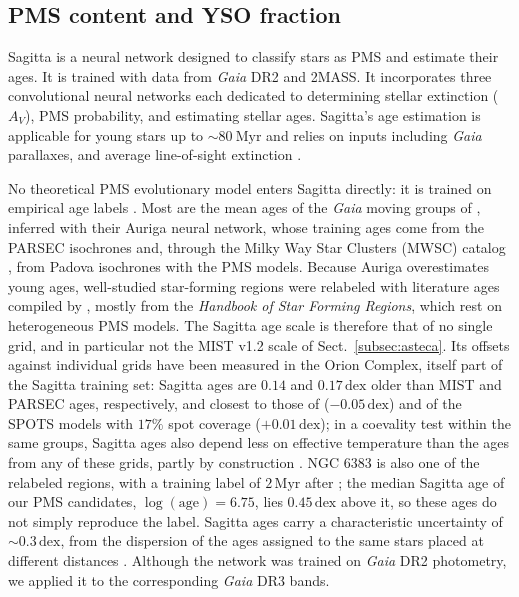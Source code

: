 \documentclass{aa}
\begin{document}
\subsection{PMS content and YSO fraction}\label{subsec:sagitta}
Sagitta is a neural network designed to classify stars as PMS and estimate their ages. It is trained with data from \textit{Gaia} DR2 and 2MASS\@. It incorporates three convolutional neural networks each dedicated to determining stellar extinction ($A_V$), PMS probability, and estimating stellar ages. Sagitta's age estimation is applicable for young stars up to $\sim 80~\mathrm{Myr}$ and relies on inputs including \textit{Gaia} parallaxes, and average line-of-sight extinction \citep{2021AJ....162..282M}.

No theoretical PMS evolutionary model enters Sagitta directly: it is trained on empirical age labels \citep{2021AJ....162..282M}. Most are the mean ages of the \textit{Gaia} moving groups of \citet{2020AJ....160..279K}, inferred with their Auriga neural network, whose training ages come from the PARSEC isochrones \citep{2017ApJ...835...77M} and, through the Milky Way Star Clusters (MWSC) catalog \citep{2013A&A...558A..53K}, from Padova isochrones with the \citet{2000A&A...358..593S} PMS models. Because Auriga overestimates young ages, well-studied star-forming regions were relabeled with literature ages compiled by \citet{2021AJ....162..282M}, mostly from the \textit{Handbook of Star Forming Regions}, which rest on heterogeneous PMS models. The Sagitta age scale is therefore that of no single grid, and in particular not the MIST v1.2 scale of Sect.~\ref{subsec:asteca}. Its offsets against individual grids have been measured in the Orion Complex, itself part of the Sagitta training set: Sagitta ages are $0.14$ and $0.17\,\mathrm{dex}$ older than MIST and PARSEC ages, respectively, and closest to those of \citet{2015A&A...577A..42B} ($-0.05\,\mathrm{dex}$) and of the SPOTS models \citep{2020ApJ...891...29S} with $17\%$ spot coverage ($+0.01\,\mathrm{dex}$); in a coevality test within the same groups, Sagitta ages also depend less on effective temperature than the ages from any of these grids, partly by construction \citep{2023AJ....165..182K}. NGC 6383 is also one of the relabeled regions, with a training label of $2\,\mathrm{Myr}$ after \citet{2008hsf2.book..497R}; the median Sagitta age of our PMS candidates, $\log(\mathrm{age})=6.75$, lies $0.45\,\mathrm{dex}$ above it, so these ages do not simply reproduce the label. Sagitta ages carry a characteristic uncertainty of $\sim0.3\,\mathrm{dex}$, from the dispersion of the ages assigned to the same stars placed at different distances \citep{2021AJ....162..282M}. Although the network was trained on \textit{Gaia} DR2 photometry, we applied it to the corresponding \textit{Gaia} DR3 bands.
\end{document}

